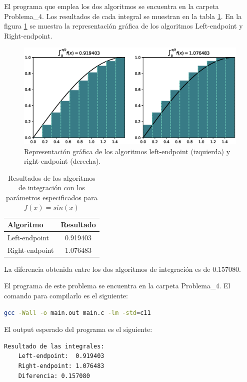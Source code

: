 El programa que emplea los dos algoritmos se encuentra en la carpeta \textcolor{citecolor}{Problema\_4}. Los resultados de cada integral se muestran en la tabla \ref{table:resultados4}. En la figura \ref{fig:integracion} se muestra la representación gráfica de los algoritmos Left-endpoint y Right-endpoint.
\begin{figure}[H]
    \centering
    \includegraphics[width=17cm]{Graphics/integration.eps}
    \caption{Representación gráfica de los algoritmos left-endpoint (izquierda) y right-endpoint (derecha).}
    \label{fig:integracion}
\end{figure}
\begin{table}[H]
    \centering
    \begin{tabular}{lc} \hline
        \textbf{Algoritmo} & \textbf{Resultado} \\\hline
        Left-endpoint      & 0.919403           \\
        Right-endpoint     & 1.076483           \\ \hline
    \end{tabular}
    \caption{Resultados de los algoritmos de integración con los parámetros especificados para $f(x)=sin(x)$}
    \label{table:resultados4}
\end{table}
La diferencia obtenida entre los dos algoritmos de integración es de 0.157080.

El programa de este problema se encuentra en la carpeta \textcolor{citecolor}{Problema\_4}. El comando para compilarlo es el siguiente:

\begin{lstlisting}[language=bash]
    gcc -Wall -o main.out main.c -lm -std=c11
\end{lstlisting}

El output esperado del programa es el siguiente:

\begin{lstlisting}[language=bash]
    Resultado de las integrales:
	Left-endpoint:	0.919403
	Right-endpoint:	1.076483
	Diferencia:	0.157080
\end{lstlisting}